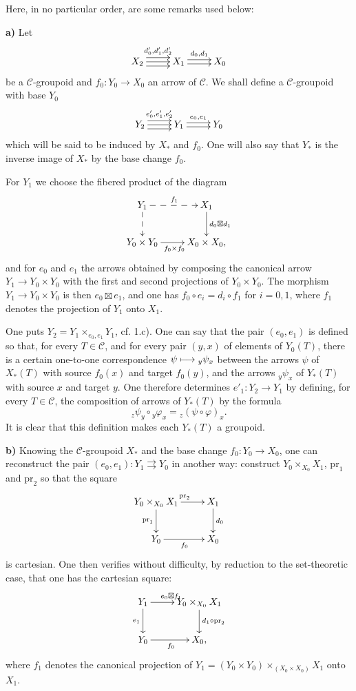 Here, in no particular order, are some remarks used below:

\textbf{a)} Let
\[
\xymatrix{X_2\ar@<1ex>[r]^{d'_0,d'_1,d'_2}\ar[r]\ar@<-1ex>[r]&X_1\ar@<.5ex>[r]^{d_0,d_1}\ar@<-.5ex>[r]&X_0}
\]
be a $\mathcal C$-groupoid and $f_0:Y_0\to X_0$ an arrow of $\mathcal C$. We shall define a $\mathcal C$-groupoid with base $Y_0$
\[
\xymatrix{Y_2\ar@<1ex>[r]^{e'_0,e'_1,e'_2}\ar[r]\ar@<-1ex>[r]&Y_1\ar@<.5ex>[r]^{e_0,e_1}\ar@<-.5ex>[r]&Y_0}
\]
which will be said to be induced by $X_*$ and $f_0$. One will also say that $Y_*$ is the inverse image of $X_*$ by the base change $f_0$.

For $Y_1$ we choose the fibered product of the diagram
\[
\xymatrix{Y_1\ar@{-->}[r]^{f_1}\ar@{-->}[d]&X_1\ar[d]^{d_0\boxtimes d_1}\\Y_0\times Y_0\ar[r]_{f_0\times f_0}&X_0\times X_0,}
\]
and for $e_0$ and $e_1$ the arrows obtained by composing the canonical arrow $Y_1\to Y_0\times Y_0$ with the first and second projections of $Y_0\times Y_0$. The morphism $Y_1\to Y_0\times Y_0$ is then $e_0\boxtimes e_1$, and one has $f_0\circ e_i=d_i\circ f_1$ for $i=0,1$, where $f_1$ denotes the projection of $Y_1$ onto $X_1$.

One puts $Y_2=Y_1\times_{e_0,e_1}Y_1$, cf. 1.c). One can say that the pair $(e_0,e_1)$ is defined so that, for every $T\in\mathcal C$, and for every pair $(y,x)$ of elements of $Y_0(T)$, there is a certain one-to-one correspondence $\psi\longmapsto{}_y\psi_x$ between the arrows $\psi$ of $X_*(T)$ with source $f_0(x)$ and target $f_0(y)$, and the arrows ${}_y\psi_x$ of $Y_*(T)$ with source $x$ and target $y$. One therefore determines $e'_1:Y_2\to Y_1$ by defining, for every $T\in\mathcal C$, the composition of arrows of $Y_*(T)$ by the formula
\[
{}_z\psi_y\circ{}_y\varphi_x={}_z(\psi\circ\varphi)_x.
\]
It is clear that this definition makes each $Y_*(T)$ a groupoid.

\textbf{b)} Knowing the $\mathcal C$-groupoid $X_*$ and the base change $f_0:Y_0\to X_0$, one can reconstruct the pair $(e_0,e_1):Y_1\rightrightarrows Y_0$ in another way: construct $Y_0\times_{X_0}X_1$, $\mathrm{pr}_1$ and $\mathrm{pr}_2$ so that the square
\[
\xymatrix{Y_0\times_{X_0}X_1\ar[r]^{\mathrm{pr}_2}\ar[d]_{\mathrm{pr}_1}&X_1\ar[d]^{d_0}\\Y_0\ar[r]_{f_0}&X_0}
\]
is cartesian. One then verifies without difficulty, by reduction to the set-theoretic case, that one has the cartesian square:
\[
\xymatrix{Y_1\ar[r]^{e_0\boxtimes f_1}\ar[d]_{e_1}&Y_0\times_{X_0}X_1\ar[d]^{d_1\circ\mathrm{pr}_2}\\Y_0\ar[r]_{f_0}&X_0,}
\]
where $f_1$ denotes the canonical projection of $Y_1=(Y_0\times Y_0)\times_{(X_0\times X_0)}X_1$ onto $X_1$.

